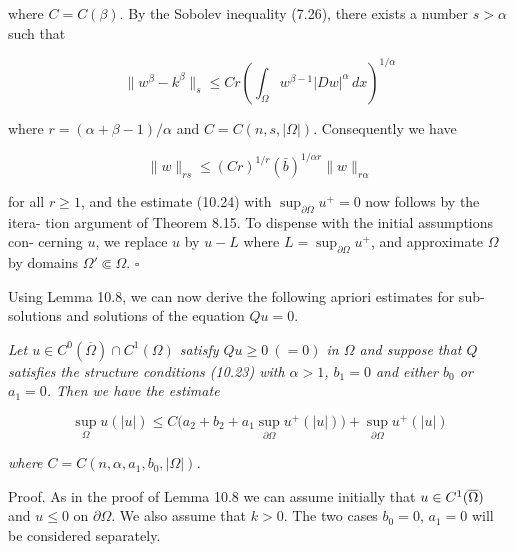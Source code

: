 where $C=C(\beta)$. By the Sobolev inequality (7.26), there exists a number $s>\alpha$ such
that

\[
\|w^{\beta}-k^{\beta}\|_{s}\le Cr\left(\int_{\Omega} w^{\beta-1}|Dw|^{\alpha}\,dx\right)^{1/\alpha}
\]

where $r=(\alpha+\beta-1)/\alpha$ and $C=C(n,s,|\Omega|)$. Consequently we have

\[
\|w\|_{rs}\le (Cr)^{1/r}(\bar b)^{1/\alpha r}\|w\|_{r\alpha}
\]

for all $r\ge 1$, and the estimate (10.24) with $\sup_{\partial\Omega} u^{+}=0$ now follows by the itera-
tion argument of Theorem 8.15. To dispense with the initial assumptions con-
cerning $u$, we replace $u$ by $u-L$ where $L=\sup_{\partial\Omega}u^{+}$, and approximate $\Omega$ by domains
$\Omega'\Subset\Omega$. $\square$

Using Lemma 10.8, we can now derive the following apriori estimates for sub-
solutions and solutions of the equation $Qu=0$.

\begin{theorem}\label{gilbarg-trudinger.thm.10.9.divergence-form-apriori-estimate}
\textit{Let $u\in C^{0}(\overline{\Omega})\cap C^{1}(\Omega)$ satisfy $Qu\ge 0\ ( =0)$ in $\Omega$ and suppose that
$Q$ satisfies the structure conditions (10.23) with $\alpha>1$, $b_1=0$ and either $b_0$ or $a_1=0$.
Then we have the estimate}

\begin{equation}\tag{10.26}
\sup_{\Omega}u(|u|)\le C\bigl(a_2+b_2+a_1\sup_{\partial\Omega}u^{+}(|u|)\bigr)+\sup_{\partial\Omega}u^{+}(|u|)
\end{equation}

\textit{where $C=C(n,\alpha,a_1,b_0,|\Omega|)$.}
\end{theorem}


Proof. As in the proof of Lemma 10.8 we can assume initially that $u\in C^{1}(\overline{\Omega})$ and
$u\le 0$ on $\partial\Omega$. We also assume that $k>0$. The two cases $b_{0}=0$, $a_{1}=0$ will
be considered separately.

